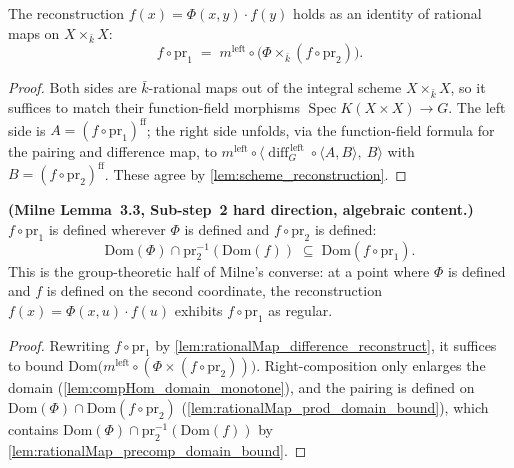\begin{lemma}\leanok
  \label{lem:rationalMap_difference_reconstruct}
  The reconstruction \(f(x) = \Phi(x,y) \cdot f(y)\) holds as an identity of rational maps
  on \(X \times_{\bar k} X\):
  \[
    f \circ \mathrm{pr}_1 \;=\; m^{\mathrm{left}} \circ
    \bigl(\Phi \times_{\bar k} (f \circ \mathrm{pr}_2)\bigr).
  \]
\end{lemma}
\begin{proof}\leanok
  Both sides are \(\bar k\)-rational maps out of the integral scheme \(X \times_{\bar k}
  X\), so it suffices to match their function-field morphisms \(\operatorname{Spec}
  K(X \times X) \to G\). The left side is \(A = (f \circ \mathrm{pr}_1)^{\mathrm{ff}}\); the
  right side unfolds, via the function-field formula for the pairing and difference map, to
  \(m^{\mathrm{left}} \circ \langle \operatorname{diff}_G^{\,\mathrm{left}} \circ \langle A,
  B\rangle,\ B\rangle\) with \(B = (f \circ \mathrm{pr}_2)^{\mathrm{ff}}\). These agree by
  \cref{lem:scheme_reconstruction}.
\end{proof}

\begin{lemma}\leanok
  \label{lem:difference_map_domain_reconstruction}
  \textbf{(Milne Lemma~3.3, Sub-step~2 hard direction, algebraic content.)}
  \(f \circ \mathrm{pr}_1\) is defined wherever \(\Phi\) is defined and \(f \circ
  \mathrm{pr}_2\) is defined:
  \[
    \mathrm{Dom}(\Phi) \cap \mathrm{pr}_2^{-1}(\mathrm{Dom}(f)) \;\subseteq\;
    \mathrm{Dom}(f \circ \mathrm{pr}_1) .
  \]
  This is the group-theoretic half of Milne's converse: at a point where \(\Phi\) is
  defined and \(f\) is defined on the second coordinate, the reconstruction
  \(f(x) = \Phi(x,u) \cdot f(u)\) exhibits \(f \circ \mathrm{pr}_1\) as regular.
\end{lemma}
\begin{proof}\leanok
  Rewriting \(f \circ \mathrm{pr}_1\) by
  \cref{lem:rationalMap_difference_reconstruct}, it suffices to bound
  \(\mathrm{Dom}\bigl(m^{\mathrm{left}} \circ (\Phi \times (f \circ \mathrm{pr}_2))\bigr)\).
  Right-composition only enlarges the domain (\cref{lem:compHom_domain_monotone}), and the
  pairing is defined on \(\mathrm{Dom}(\Phi) \cap \mathrm{Dom}(f \circ \mathrm{pr}_2)\)
  (\cref{lem:rationalMap_prod_domain_bound}), which contains \(\mathrm{Dom}(\Phi) \cap
  \mathrm{pr}_2^{-1}(\mathrm{Dom}(f))\) by \cref{lem:rationalMap_precomp_domain_bound}.
\end{proof}

